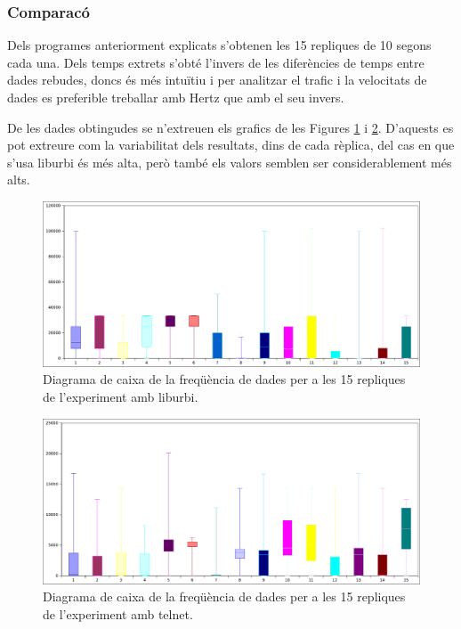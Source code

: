 \documentclass[12pt,a4paper,final,twoside]{article}
\begin{document}
\subsubsection{Comparacó}

Dels programes anteriorment explicats s'obtenen les 15 repliques de 10 segons cada una. Dels temps extrets s'obté l'invers de les diferències de temps entre dades rebudes, doncs és més intuïtiu i per analitzar el trafic i la velocitats de dades es preferible treballar amb Hertz que amb el seu invers.

De les dades obtingudes se n'extreuen els grafics de les Figures \ref{fig:OneLegC++Box} i \ref{fig:OneLegPythonBox}. D'aquests es pot extreure com la variabilitat dels resultats, dins de cada rèplica, del cas en que s'usa liburbi és més alta, però també els valors semblen ser considerablement més alts. 

\begin{figure}[h!]
	\centering
    \includegraphics[scale=0.5]{images/OnelegC++Box.pdf}
	 \caption{Diagrama de caixa de la freqüència de dades per a les 15 repliques de l'experiment amb liburbi.}
  \label{fig:OneLegC++Box}
\end{figure}

\begin{figure}[h!]
	\centering
    \includegraphics[scale=0.5]{images/OneLegPythonBox.pdf}
	 \caption{Diagrama de caixa de la freqüència de dades per a les 15 repliques de l'experiment amb telnet.}
  \label{fig:OneLegPythonBox}
\end{figure}
\end{document}

